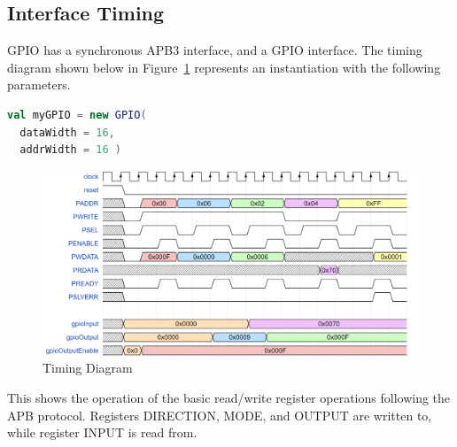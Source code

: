 

\newpage
\subsection{Interface Timing}

GPIO has a synchronous APB3 interface, and a GPIO interface. The timing diagram shown below
in Figure~\ref{fig:timing} represents an instantiation with the following
parameters.

\begin{lstlisting}[language=Scala]
val myGPIO = new GPIO(
  dataWidth = 16, 
  addrWidth = 16 ) 
\end{lstlisting}

\begin{figure}[h]
  \includegraphics[width=\textwidth]{images/GPIO-timing.png}
  \caption{Timing Diagram}\label{fig:timing}
\end{figure}

This shows the operation of the basic read/write register operations following the APB protocol. Registers DIRECTION, MODE, and OUTPUT are
written to, while register INPUT is read from.


